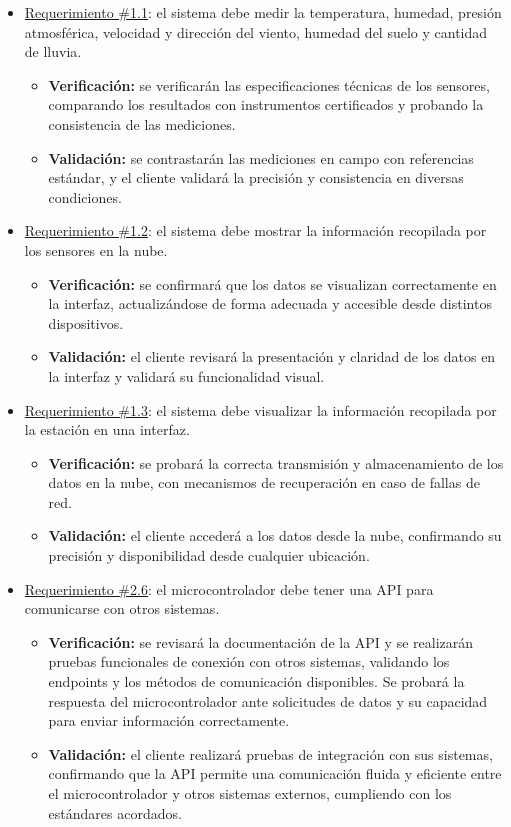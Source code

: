 \documentclass[
11pt, %
codirector, %
]{charter}
\begin{document}
\begin{itemize}
	\item \underline{Requerimiento \#1.1}: el sistema debe medir la temperatura, humedad, presión atmosférica, velocidad y dirección del viento, humedad del suelo y cantidad de lluvia.
		\begin{itemize}
			\item \textbf{Verificación:} se verificarán las especificaciones técnicas de los sensores, comparando los resultados con instrumentos certificados y probando la consistencia de las mediciones.
			\item \textbf{Validación:} se contrastarán las mediciones en campo con referencias estándar, y el cliente validará la precisión y consistencia en diversas condiciones.
		\end{itemize}
			
	\item \underline{Requerimiento \#1.2}: el sistema debe mostrar la información recopilada por los sensores en la nube.
		\begin{itemize}
			\item \textbf{Verificación:} se confirmará que los datos se visualizan correctamente en la interfaz, actualizándose de forma adecuada y accesible desde distintos dispositivos.
			\item \textbf{Validación:} el cliente revisará la presentación y claridad de los datos en la interfaz y validará su funcionalidad visual.
		\end{itemize}
			
	\item \underline{Requerimiento \#1.3}: el sistema debe visualizar la información recopilada por la estación en una interfaz.
		\begin{itemize}
			\item \textbf{Verificación:} se probará la correcta transmisión y almacenamiento de los datos en la nube, con mecanismos de recuperación en caso de fallas de red.
			\item \textbf{Validación:} el cliente accederá a los datos desde la nube, confirmando su precisión y disponibilidad desde cualquier ubicación.
		\end{itemize}

	\item \underline{Requerimiento \#2.6}: el microcontrolador debe tener una API para comunicarse con otros sistemas.
		\begin{itemize}
			\item \textbf{Verificación:} se  revisará la documentación de la API y se realizarán pruebas funcionales de conexión con otros sistemas, validando los endpoints y los métodos de comunicación disponibles. Se probará la respuesta del microcontrolador ante solicitudes de datos y su capacidad para enviar información correctamente.
			\item \textbf{Validación:} el cliente realizará pruebas de integración con sus sistemas, confirmando que la API permite una comunicación fluida y eficiente entre el microcontrolador y otros sistemas externos, cumpliendo con los estándares acordados.
		\end{itemize}
		

\end{itemize}
\end{document}
